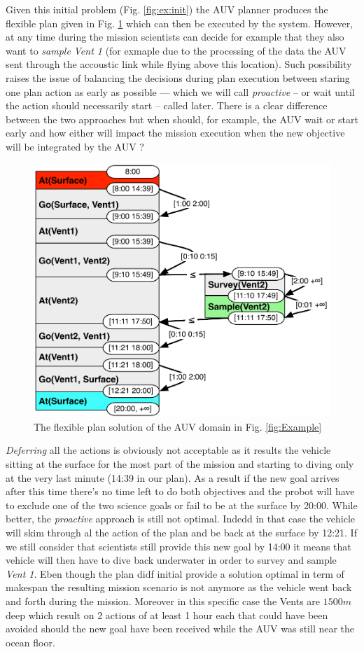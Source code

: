 Given this initial problem (Fig. \ref{fig:ex:init}) the AUV planner
produces the flexible plan given in Fig. \ref{fig:ex:plan} which can
then be executed by the system. However, at any time during the
mission scientists can decide for example that they also want to {\em
  sample} {\em Vent 1} (for exmaple due to the processing of the data
the AUV sent through the accoustic link while flying above this
location). Such possibility raises the issue of balancing the
decisions during plan execution between staring one plan action as
early as possible --- which we will call {\em proactive} -- or wait
until the action should necessarily start -- called later. There is a 
clear difference between the two approaches but when should, for 
example, the AUV wait or start early and how either will impact the
mission execution when the new objective will be integrated by the 
AUV ? 

\begin{figure}[!htb]
  \centering
  \includegraphics[width=0.8\columnwidth]{figs/example_plan}
  \caption{\small The flexible plan solution of the AUV domain in
    Fig. \ref{fig:Example}}
  \label{fig:ex:plan}
\end{figure}

{\em Deferring} all the actions is obviously not acceptable as 
it results the vehicle sitting at the surface for the most part of the
mission and starting to diving only at the very last minute (14:39 in
our plan). As a result if the new goal arrives after this time there's
no time left to do both objectives and the probot will have to exclude
one of the two science goals or fail to be at the surface by
20:00. While better, the {\em proactive} approach is still not
optimal. Indedd in that case the vehicle will skim through al the
action of the plan and be back at the surface by 12:21. If we still
consider that scientists still provide this new goal by 14:00  it
means that vehicle  will then have to dive back underwater in order to
survey and sample {\em Vent 1}. Eben though the plan didf initial
provide a solution optimal in term of makespan the resulting mission
scenario is not anymore as the vehicle went back and forth during the
mission. Moreover in this specific case the Vents are $1500 m$ deep
which result on 2 actions of at least 1 hour each that could have been
avoided should the new goal have been received while the AUV was still 
near the ocean floor. 

